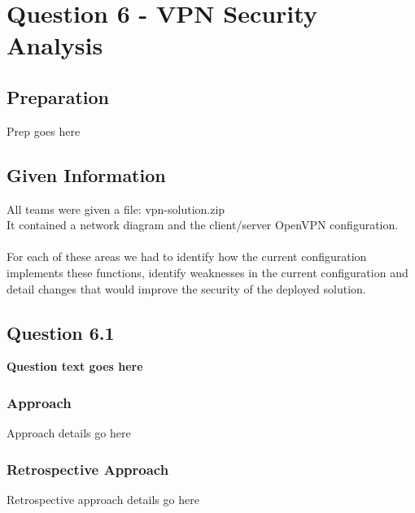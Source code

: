 \chapter{Question 6 - VPN Security Analysis}

\section{Preparation}
Prep goes here

\section{Given Information}
All teams were given a file: vpn-solution.zip\\
It contained a network diagram and the client/server OpenVPN configuration.
\\\\
For each of these areas we had to identify how the current configuration
implements these functions, identify weaknesses in the current configuration and
detail changes that would improve the security of the deployed solution.

\section{Question 6.1}
\textbf{Question text goes here}
\subsection{Approach}
Approach details go here
\subsection{Retrospective Approach}
Retrospective approach details go here
